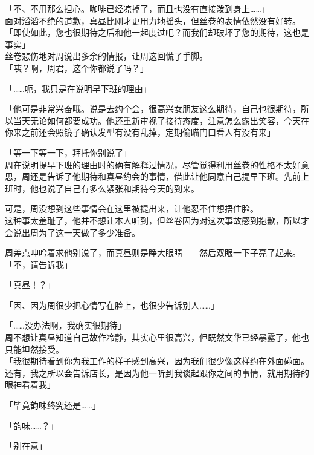 「不、不用那么担心。咖啡已经凉掉了，而且也没有直接泼到身上……」\\

面对滔滔不绝的道歉，真昼比刚才更用力地摇头，但丝卷的表情依然没有好转。\\

「即使如此，您也很期待之后和他一起度过吧？而我们却破坏了您的期待，这也是事实」\\

丝卷悲伤地对周说出多余的情报，让周这回慌了手脚。\\

「咦？啊，周君，这个你都说了吗？」

「……呃，我只是在说明早下班的理由」

「他可是非常兴奋哦。说是去约个会，很高兴女朋友这么期待，自己也很期待，所以当天无论如何都要成功。他还重新审视了接待态度，注意怎么露出笑容，今天在你来之前还会照镜子确认发型有没有乱掉，定期偷瞄门口看人有没有来」

「等一下等一下，拜托你别说了」\\

周在说明提早下班的理由时的确有解释过情况，尽管觉得利用丝卷的性格不太好意思，周还是告诉了他期待和真昼约会的事情，借此让他同意自己提早下班。先前上班时，他也说了自己有多么紧张和期待今天的到来。

可是，周没想到这些事情会在这里被提出来，让他忍不住想捂住脸。\\

这种事太羞耻了，他并不想让本人听到，但丝卷因为对这次事故感到抱歉，所以才会说出周为了这一天做了多少准备。

周差点呻吟着求他别说了，而真昼则是睁大眼睛——然后双眼一下子亮了起来。\\

「不，请告诉我」

「真昼！？」

「因、因为周很少把心情写在脸上，也很少告诉别人……」

「……没办法啊，我确实很期待」\\

周不想让真昼知道自己故作冷静，其实心里很高兴，但既然文华已经暴露了，他也只能坦然接受。\\

「我很期待看到你为我工作的样子感到高兴，因为我们很少像这样约在外面碰面。还有，我之所以会告诉店长，是因为他一听到我谈起跟你之间的事情，就用期待的眼神看着我」

「毕竟韵味终究还是……」

「韵味……？」

「别在意」\\

